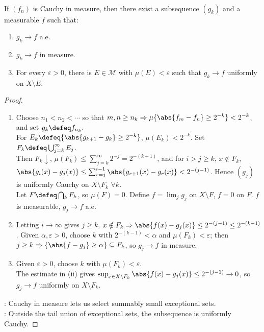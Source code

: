 \begin{theorem} \label{thm:riesz-subsequence-cauchy-measure} \\
If $(f_n)$ is Cauchy in measure, then there exist a subsequence $(g_k)$ and a measurable $f$ such that:
\begin{enumerate}[label=(\roman*)]
\setlength{\itemsep}{0pt}
\item $g_k\to f$ a.e.
\item $g_k\to f$ in measure.
\item For every $\varepsilon>0$, there is $E\in\mathcal{M}$ with $\mu(E)<\varepsilon$ such that $g_k\to f$ uniformly on $X\setminus E$.
\end{enumerate}
\begin{proof}
\begin{enumerate}[label=(\roman*)]
\setlength{\itemsep}{0pt}
\item Choose $n_1<n_2<\cdots$ so that $m,n\geq n_k\Rightarrow\mu\{\abs{f_m-f_n}\geq2^{-k}\}<2^{-k}$, and set $g_k\defeq f_{n_k}$.\\
For $E_k\defeq\{\abs{g_{k+1}-g_k}\geq2^{-k}\}$, $\mu(E_k)<2^{-k}$. Set $F_k\defeq\bigcup_{j=k}^{\infty}E_j$.\\
Then $F_k\downarrow$, $\mu(F_k)\leq\sum_{j=k}^{\infty}2^{-j}=2^{-(k-1)}$, and for $i>j\geq k$, $x\notin F_k$,\\
$\abs{g_i(x)-g_j(x)}\leq\sum_{r=j}^{i-1}\abs{g_{r+1}(x)-g_r(x)}<2^{-(j-1)}$. Hence $(g_j)$ is uniformly Cauchy on $X\setminus F_k$ $\forall k$.\\
Let $F\defeq\bigcap_kF_k$, so $\mu(F)=0$. Define $f=\lim_jg_j$ on $X\setminus F$, $f=0$ on $F$. $f$ is measurable, $g_j\to f$ a.e.
\item Letting $i\to\infty$ gives $j\geq k$, $x\notin F_k\Rightarrow \abs{f(x)-g_j(x)}\leq2^{-(j-1)}\leq2^{-(k-1)}$. Given $\alpha,\varepsilon>0$, choose $k$ with $2^{-(k-1)}<\alpha$ and $\mu(F_k)<\varepsilon$; then $j\geq k\Rightarrow \{\abs{f-g_j}\geq\alpha\}\subseteq F_k$, so $g_j\to f$ in measure.
\item Given $\varepsilon>0$, choose $k$ with $\mu(F_k)<\varepsilon$.\\
The estimate in (ii) gives $\sup_{x\in X\setminus F_k}\abs{f(x)-g_j(x)}\leq2^{-(j-1)}\to0$, so $g_j\to f$ uniformly on $X\setminus F_k$.
\end{enumerate}
: Cauchy in measure lets us select summably small exceptional sets.\\
: Outside the tail union of exceptional sets, the subsequence is uniformly Cauchy.
\end{proof}
\end{theorem}

